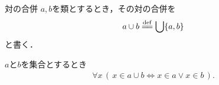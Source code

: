 	\begin{itembox}[l]{対の合併}
		$a,b$を類とするとき，その対の合併を
		\begin{align}
			a \cup b \defeq \bigcup \{a,b\}
		\end{align}
		と書く．
	\end{itembox}
	
	\begin{screen}
		\begin{thm}[対の合併はそれぞれの要素を合わせたもの]\label{thm:union_of_pair_is_union_of_their_elements}
			$a$と$b$を集合とするとき
			\begin{align}
				\forall x\, (\, x \in a \cup b \Longleftrightarrow x \in a \vee x \in b\, ).
			\end{align}
		\end{thm}
	\end{screen}
	
	
